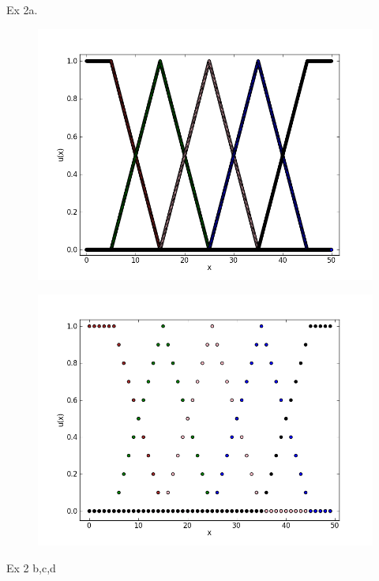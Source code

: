 \documentclass{report}
\begin{document}
\newpage

Ex 2a.
\begin{figure}[hptb]
\includegraphics[scale=0.5]{ex1b1000.png}
\end{figure}
\begin{figure}[hptb]
\includegraphics[scale=0.5]{ex2a50.png}
\end{figure}

\newpage
Ex 2 b,c,d
\end{document}
